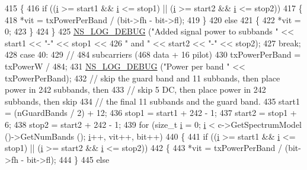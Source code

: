 \begin{DoxyCode}
415         \{
416           \textcolor{keywordflow}{if} ((\hyperlink{bernuolliDistribution_8m_a6f6ccfcf58b31cb6412107d9d5281426}{i} >= start1 && \hyperlink{bernuolliDistribution_8m_a6f6ccfcf58b31cb6412107d9d5281426}{i} <= stop1) || (\hyperlink{bernuolliDistribution_8m_a6f6ccfcf58b31cb6412107d9d5281426}{i} >= start2 && \hyperlink{bernuolliDistribution_8m_a6f6ccfcf58b31cb6412107d9d5281426}{i} <= stop2))
417             \{
418               *vit = txPowerPerBand / (bit->fh - bit->fl);
419             \}
420           \textcolor{keywordflow}{else}
421             \{
422               *vit = 0;
423             \}
424         \}
425       \hyperlink{group__logging_ga413f1886406d49f59a6a0a89b77b4d0a}{NS\_LOG\_DEBUG} (\textcolor{stringliteral}{"Added signal power to subbands "} << start1 << \textcolor{stringliteral}{"-"} << stop1 <<
426                     \textcolor{stringliteral}{" and "} << start2 << \textcolor{stringliteral}{"-"} << stop2);
427       \textcolor{keywordflow}{break};
428     \textcolor{keywordflow}{case} 40:
429       \textcolor{comment}{// 484 subcarriers (468 data + 16 pilot)}
430       txPowerPerBand = txPowerW / 484;
431       \hyperlink{group__logging_ga413f1886406d49f59a6a0a89b77b4d0a}{NS\_LOG\_DEBUG} (\textcolor{stringliteral}{"Power per band "} << txPowerPerBand);
432       \textcolor{comment}{// skip the guard band and 11 subbands, then place power in 242 subbands, then}
433       \textcolor{comment}{// skip 5 DC, then place power in 242 subbands, then skip}
434       \textcolor{comment}{// the final 11 subbands and the guard band.}
435       start1 = (nGuardBands / 2) + 12;
436       stop1 = start1 + 242 - 1;
437       start2 = stop1 + 6;
438       stop2 = start2 + 242 - 1;
439       \textcolor{keywordflow}{for} (\textcolor{keywordtype}{size\_t} \hyperlink{bernuolliDistribution_8m_a6f6ccfcf58b31cb6412107d9d5281426}{i} = 0; \hyperlink{bernuolliDistribution_8m_a6f6ccfcf58b31cb6412107d9d5281426}{i} < c->GetSpectrumModel ()->GetNumBands (); \hyperlink{bernuolliDistribution_8m_a6f6ccfcf58b31cb6412107d9d5281426}{i}++, vit++, bit++)
440         \{
441           \textcolor{keywordflow}{if} ((\hyperlink{bernuolliDistribution_8m_a6f6ccfcf58b31cb6412107d9d5281426}{i} >= start1 && \hyperlink{bernuolliDistribution_8m_a6f6ccfcf58b31cb6412107d9d5281426}{i} <= stop1) || (\hyperlink{bernuolliDistribution_8m_a6f6ccfcf58b31cb6412107d9d5281426}{i} >= start2 && \hyperlink{bernuolliDistribution_8m_a6f6ccfcf58b31cb6412107d9d5281426}{i} <= stop2))
442             \{
443               *vit = txPowerPerBand / (bit->fh - bit->fl);
444             \}
445           \textcolor{keywordflow}{else}

\end{DoxyCode}
